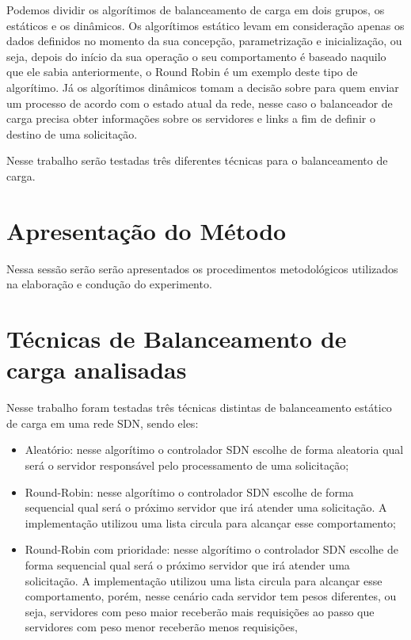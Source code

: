 \documentclass[12pt]{article}
\begin{document}
Podemos dividir os algorítimos de balanceamento de carga em dois grupos, os estáticos e os dinâmicos. Os algorítimos estático levam em consideração apenas os dados definidos no momento da sua concepção, parametrização e inicialização, ou seja, depois do início da sua operação o seu comportamento é baseado naquilo que ele sabia anteriormente, o Round Robin é um exemplo deste tipo de algorítimo. Já os algorítimos dinâmicos tomam a decisão sobre para quem enviar um processo de acordo com o estado atual da rede, nesse caso o balanceador de carga precisa obter informações sobre os servidores e links a fim de definir o destino de uma solicitação.

Nesse trabalho serão testadas três diferentes técnicas para o balanceamento de carga. 
\section{Apresentação do Método}

Nessa sessão serão serão apresentados os procedimentos metodológicos utilizados na elaboração e condução do experimento. 

\section{Técnicas de Balanceamento de carga analisadas}

Nesse trabalho foram testadas três técnicas distintas de balanceamento estático de carga em uma rede SDN, sendo eles:

\begin{itemize}
    \item Aleatório: nesse algorítimo o controlador SDN escolhe de forma aleatoria qual será o servidor responsável pelo processamento de uma solicitação;
    \item Round-Robin: nesse algorítimo o controlador SDN escolhe de forma sequencial qual será o próximo servidor que irá atender uma solicitação. A implementação utilizou uma lista circula para alcançar esse comportamento;
    \item Round-Robin com prioridade: nesse algorítimo o controlador SDN escolhe de forma sequencial qual será o próximo servidor que irá atender uma solicitação. A implementação utilizou uma lista circula para alcançar esse comportamento, porém, nesse cenário cada servidor tem pesos diferentes, ou seja, servidores com peso maior receberão mais requisições ao passo que servidores com peso menor receberão menos requisições,
\end{itemize}
\end{document}
